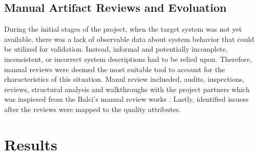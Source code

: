 \documentclass{llncs}
\begin{document}
    \subsection{Manual Artifact Reviews and Evoluation}
    During the initial stages of the project, when the target system was not yet available, there was a lack of observable data about system behavior that could be utilized for validation. 
    Instead, informal and potentially incomplete, inconsistent, or incorrect system descriptions had to be relied upon. Therefore, manual reviews were deemed the most suitable tool to account for the characteristics of this situation. Manul review inclueded, audits, inspections, reviews, structural analysis 
    and walkthroughs with the project partners which was inspiered from the Balci's manual review works \cite{balcitechniques}. Lastly, identified issuess after the reviews were mapped to the quality attributes. 
    
    \section{Results}
    
\end{document}
